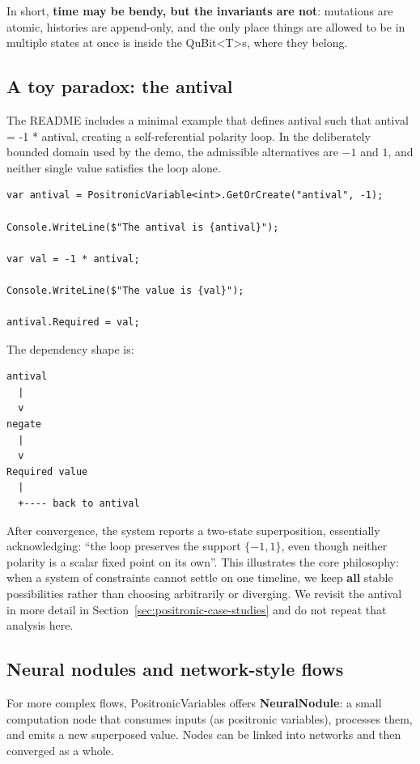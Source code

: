 \documentclass[a4paper,11pt]{article}
\begin{document}
In short, \textbf{time may be bendy, but the invariants are not}: mutations are atomic, histories are append-only, and the only place things are allowed to be in multiple states at once is inside the QuBit\textless T\textgreater s, where they belong.

\subsection{A toy paradox: the antival}

The README includes a minimal example that defines antival such that antival =
-1 * antival, creating a self-referential polarity loop. In the deliberately bounded
domain used by the demo, the admissible alternatives are \(-1\) and \(1\), and neither
single value satisfies the loop alone.

\begin{lstlisting}[style=codeblock]
var antival = PositronicVariable<int>.GetOrCreate("antival", -1);

Console.WriteLine($"The antival is {antival}");

var val = -1 * antival;

Console.WriteLine($"The value is {val}");

antival.Required = val;
\end{lstlisting}

The dependency shape is:

\begin{lstlisting}[style=datadumpnofloat]
antival
  |
  v
negate
  |
  v
Required value
  |
  +---- back to antival
\end{lstlisting}

After convergence, the system reports a two-state superposition, essentially
acknowledging: ``the loop preserves the support \(\{-1,1\}\), even though neither
polarity is a scalar fixed point on its own''. This illustrates the core philosophy:
when a system of constraints cannot
settle on one timeline, we keep \textbf{all} stable possibilities rather than choosing
arbitrarily or diverging. We revisit the antival in more detail in
Section~\ref{sec:positronic-case-studies} and do not repeat that analysis here.

\subsection{Neural nodules and network-style flows}

For more complex flows, PositronicVariables offers \textbf{NeuralNodule}: a small computation node that consumes inputs (as positronic variables), processes them, and emits a new superposed value. Nodes can be linked into networks and then converged as a whole.
\end{document}
